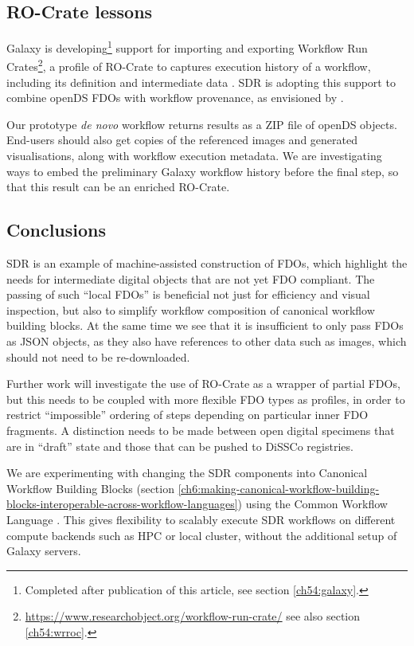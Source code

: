 \subsection{RO-Crate lessons}\label{ch7:ro-crate-lessons}

Galaxy is developing\footnote{
    Completed after publication of this article, see section \vref{ch54:galaxy}.
} support for importing and
exporting Workflow
Run Crates\footnote{\url{https://www.researchobject.org/workflow-run-crate/} see also section \vref{ch54:wrroc}.}, a profile of RO-Crate \cite{Soiland-Reyes 2022a} to
captures execution history of a workflow, including its definition and
intermediate data \cite{De Geest 2022}. SDR is adopting this support to
combine openDS FDOs with workflow provenance, as envisioned by
\cite{Walton 2020a}.

Our prototype \emph{de novo} workflow returns results as a \gls{ZIP} file of
openDS objects. End-users should also get copies of the referenced
images and generated visualisations, along with workflow execution
metadata. We are investigating ways to embed the preliminary Galaxy
workflow history before the final step, so that this result can be an
enriched RO-Crate.

\subsection{Conclusions}\label{ch7:conclusions}

SDR is an example of machine-assisted construction of FDOs, which
highlight the needs for intermediate digital objects that are not yet
FDO compliant. The passing of such ``local FDOs'' is beneficial not just
for efficiency and visual inspection, but also to simplify workflow
composition of canonical workflow building blocks. At the same time we
see that it is insufficient to only pass FDOs as JSON objects, as they
also have references to other data such as images, which should not need
to be re-downloaded.

Further work will investigate the use of RO-Crate as a wrapper of
partial FDOs, but this needs to be coupled with more flexible FDO types
as profiles, in order to restrict ``impossible'' ordering of steps
depending on particular inner FDO fragments. A distinction needs to be
made between open digital specimens that are in ``draft'' state and
those that can be pushed to \acrshort{DiSSCo} registries.

We are experimenting with changing the SDR components into Canonical
Workflow Building Blocks \cite{Soiland-Reyes 2022b}
(section \vref{ch6:making-canonical-workflow-building-blocks-interoperable-across-workflow-languages}) 
using the Common Workflow Language \cite{Crusoe 2022}. This gives
flexibility to scalably execute SDR workflows on different compute
backends such as HPC or local cluster, without the additional setup of
Galaxy servers.

